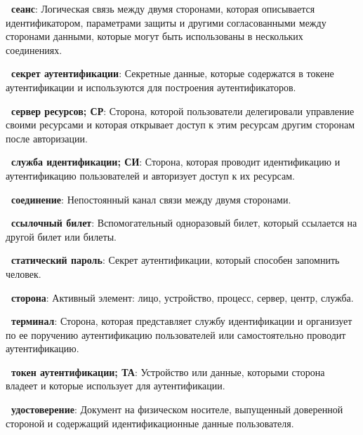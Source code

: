 
{\bf \thedefctr~сеанс}:
Логическая связь между двумя сторонами, которая описывается 
идентификатором, параметрами защиты и другими согласованными между 
сторонами данными, которые могут быть использованы в нескольких 
соединениях. 

{\bf \thedefctr~секрет аутентификации}:
Секретные данные, которые содержатся в токене аутентификации
и используются для построения аутентификаторов.

{\bf \thedefctr~сервер ресурсов; СР}:
Сторона, которой пользователи делегировали управление своими ресурсами и которая
открывает доступ к этим ресурсам другим сторонам после авторизации.

{\bf \thedefctr~служба идентификации; СИ}:
Сторона, которая проводит идентификацию и аутентификацию пользователей 
и авторизует доступ к их ресурсам.
	
{\bf \thedefctr~соединение}:
Непостоянный канал связи между двумя сторонами. 

{\bf \thedefctr~ссылочный билет}:
Вспомогательный одноразовый билет, который ссылается на другой билет или 
билеты.


{\bf \thedefctr~статический пароль}:
Секрет аутентификации, который способен запомнить человек.

{\bf \thedefctr~сторона}:
Активный элемент: лицо, устройство, процесс, сервер, центр, служба.

{\bf \thedefctr~терминал}:
Сторона, которая представляет службу идентификации и организует по ее поручению
аутентификацию пользователей или самостоятельно проводит аутентификацию.

{\bf \thedefctr~токен аутентификации; ТА}:
Устройство или данные, которыми сторона владеет и которые использует для
аутентификации.

{\bf \thedefctr~удостоверение}:
Документ на физическом носителе, выпущенный доверенной стороной и содержащий
идентификационные данные пользователя.


